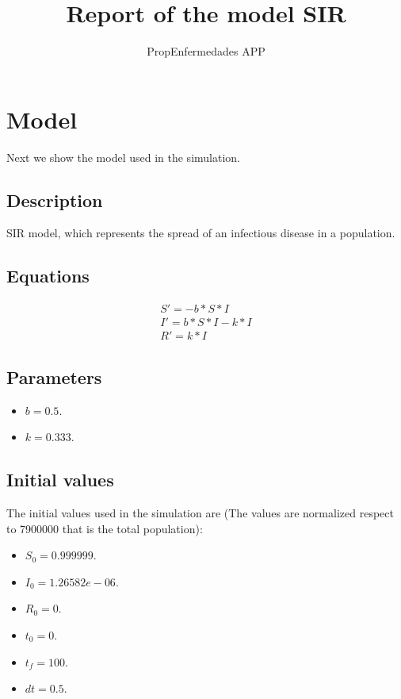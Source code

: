 \documentclass{article}
\title{Report of the model SIR}
\author{PropEnfermedades APP}
\date{}
\begin{document}
\maketitle
\section{Model}
Next we show the model used in the simulation.
\subsection*{Description}
SIR model, which represents the spread of an infectious disease in a population.
\subsection*{Equations}
\begin{equation}
\begin{split}
S' = -b * S * I \\ I' = b * S * I - k * I \\ R' = k * I
\end{split}
\end{equation}
\subsection*{Parameters}
\begin{itemize}
\item $b = 0.5$. 
\item $k = 0.333$. 
\end{itemize}
\subsection*{Initial values}
The initial values used in the simulation are (The values are normalized respect to 7900000 that is the total population):
\begin{itemize}
\item $S_0 = 0.999999$. 
\item $I_0 = 1.26582e-06$. 
\item $R_0 = 0$. 
\item $t_0 = 0$. 
\item $t_f = 100$. 
\item $dt = 0.5$. 
\end{itemize}
\end{document}
